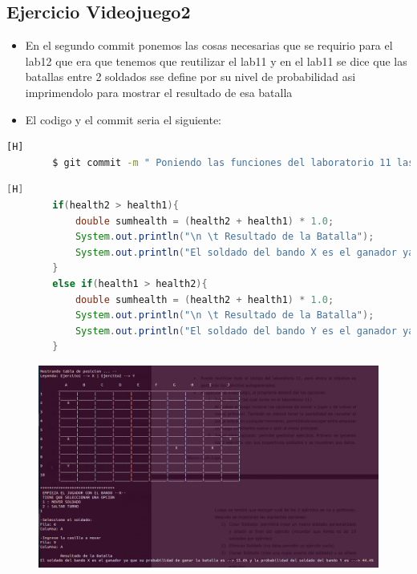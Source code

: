 \documentclass{article}
\begin{document}
	\subsection{Ejercicio Videojuego2}
	\begin{itemize}	
		\item En el segundo commit ponemos las cosas necesarias que se requirio para el lab12 que era que tenemos que reutilizar el lab11 y en el lab11 se dice que las batallas entre 2 soldados sse define por su nivel de probabilidad asi imprimendolo para mostrar el resultado de esa batalla
		\item El codigo y el commit seria el siguiente:
	\end{itemize}	
	\begin{lstlisting}[language=bash,caption={Commit}][H]
		$ git commit -m " Poniendo las funciones del laboratorio 11 las cuales se pedian para hacer este lab por ejemplo las batallas entre 2 soldados y el resultado de estas mediante porcentajes de probabilidad"
	\end{lstlisting}	
	\begin{lstlisting}[language=java,caption={Las lineas de codigos del metodo creado:}][H]
		if(health2 > health1){
            double sumhealth = (health2 + health1) * 1.0;
            System.out.println("\n \t Resultado de la Batalla");
            System.out.println("El soldado del bando X es el ganador ya que su probabilidad de ganar la batalla es --> " +  String.format( "%.1f" , ((health2/sumhealth) * 1000 ) / 10)  + "% y la probabilidad del soldado del bando Y es ---> " + String.format( "%.1f" , ((health1/sumhealth) * 1000) / 10) + "%" );
		}
		else if(health1 > health2){
			double sumhealth = (health2 + health1) * 1.0; 
			System.out.println("\n \t Resultado de la Batalla");
			System.out.println("El soldado del bando Y es el ganador ya que su probabilidad de ganar la batalla es --> " +  String.format( "%.1f" , ((health1/sumhealth) * 1000 ) / 10)  + "% y la probabilidad del soldado del bando X es ---> " + String.format( "%.1f" , ((health2/sumhealth) * 1000) / 10) + "%" );
		}
	\end{lstlisting}
	\begin{figure}[H]
		\centering
		\includegraphics[width=1.0\textwidth,keepaspectratio]{img/Commit2.png}
	\end{figure}
\end{document}
